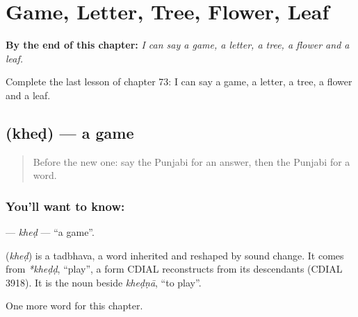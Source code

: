 
\chapter{Game, Letter, Tree, Flower, Leaf}
\label{ch:pa-game-letter-tree-flower-leaf}

\begin{chapteropening}
\textbf{By the end of this chapter:} \emph{I can say a game, a letter, a tree, a flower and a leaf.}

Complete the last lesson of chapter 73: I can say a game, a letter, a tree, a flower and a leaf.
\end{chapteropening}

\section[\texorpdfstring{\pa{ਖੇਡ} (kheḍ)}{ਖੇਡ (kheḍ)}]{ (kheḍ) — a game}

\label{lesson:PA-C73-khed}



\begin{quote}
Before the new one: say the Punjabi for an answer, then the Punjabi for a word.
\end{quote}

\subsection*{You'll want to know: }
\textbf{} — \emph{kheḍ} — \textquotedblleft{}a game\textquotedblright{}.

\begin{cousinweb}
\textbf{} (\emph{kheḍ}) is a tadbhava, a word inherited and reshaped by sound change. It comes from \emph{*kheḍḍ}, \textquotedblleft{}play\textquotedblright{}, a form CDIAL reconstructs from its descendants (CDIAL 3918). It is the noun beside \emph{kheḍṇā}, \textquotedblleft{}to play\textquotedblright{}.
\end{cousinweb}

\begin{grammarlens}[title={What you've built}]
One more word for this chapter.
\end{grammarlens}

